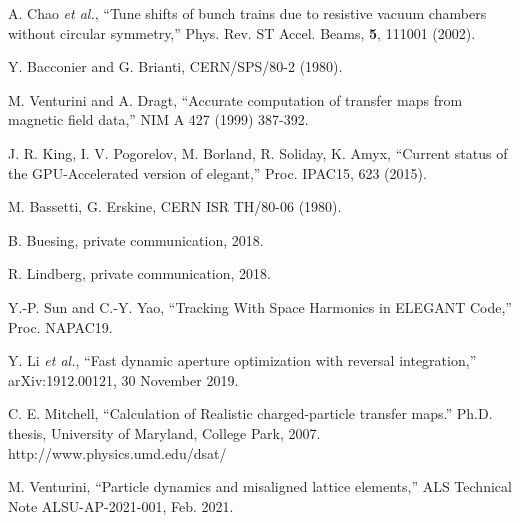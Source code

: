 \documentclass[11pt]{article}
\begin{document}
\begin{thebibliography}{99}
  A. Chao {\em et al.}, ``Tune shifts of bunch trains due to resistive vacuum chambers without circular symmetry,''
  Phys. Rev. ST Accel. Beams, {\bf 5}, 111001 (2002).

Y. Bacconier and G. Brianti, CERN/SPS/80-2 (1980).

M. Venturini and A. Dragt, ``Accurate computation of transfer maps from magnetic field data,'' 
NIM A 427 (1999) 387-392.

J. R. King, I. V. Pogorelov, M. Borland, R. Soliday, K. Amyx,
``Current status of the GPU-Accelerated version of elegant,''
Proc. IPAC15, 623 (2015).

M. Bassetti, G. Erskine, CERN ISR TH/80-06 (1980).

B. Buesing, private communication, 2018.

R. Lindberg, private communication, 2018.

Y.-P. Sun and C.-Y. Yao, ``Tracking With Space Harmonics in ELEGANT Code,'' Proc. NAPAC19.

  Y. Li {\em et al.}, ``Fast dynamic aperture optimization with reversal integration,''
  arXiv:1912.00121, 30 November 2019.

  C. E. Mitchell, ``Calculation of Realistic charged-particle transfer maps.'' Ph.D. thesis, University of Maryland, College Park, 2007. http://www.physics.umd.edu/dsat/

 M. Venturini, ``Particle dynamics and misaligned lattice elements,'' ALS Technical Note ALSU-AP-2021-001, Feb. 2021.

\end{thebibliography}
\end{document}
